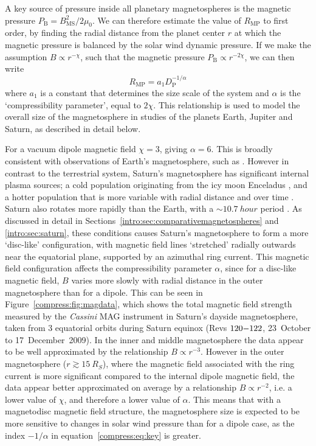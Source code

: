 A key source of pressure inside all planetary magnetospheres is the magnetic pressure $P_\mathrm{B}=B_\mathrm{MS}^2/2\mu_0$. We can therefore estimate the value of $R_\mathrm{MP}$ to first order, by finding the radial distance from the planet center $r$ at which the magnetic pressure is  balanced by the solar wind dynamic pressure. If we make the assumption $B \propto r^{-\chi}$, such that the magnetic pressure $P_\mathrm{B} \propto r^{-2\chi}$, we can then write
\begin{equation}\label{compress:eq:key}
R_\mathrm{MP}=a_1D_\mathrm{P}^{-1/\alpha}
\end{equation}
where $a_1$ is a constant that determines the size scale of the system and $\alpha$ is the `compressibility parameter', equal to $2\chi$. This relationship is used to model the overall size of the magnetosphere in studies of the planets Earth, Jupiter and Saturn, as described in detail below. 

For a vacuum dipole magnetic field $\chi=3$, giving $\alpha=6$. This is broadly consistent with observations of Earth's magnetosphere, such as \citet{shue1997}. However in contrast to the terrestrial system, Saturn's magnetosphere has significant internal plasma sources; a cold population originating from the icy moon Enceladus \citep[e.g.][]{dougherty2006,tokar2006}, and a hotter population that is more variable with radial distance and over time \citep[e.g.][]{sergis2009}. Saturn also rotates more rapidly  than the Earth, with a ${\sim}\SI{10.7}{hour}$ period \citep{desch1981}. As discussed in detail in Sections~\ref{intro:sec:comparativemagnetospheres} and \ref{intro:sec:saturn}, these conditions causes Saturn's magnetosphere to form a more `disc-like' configuration, with magnetic field lines `stretched' radially outwards near the equatorial plane, supported by an azimuthal ring current. This magnetic field configuration affects the compressibility parameter $\alpha$, since for a disc-like magnetic field, $B$ varies more slowly with radial distance in the outer magnetosphere than for a dipole. This can be seen in Figure~\ref{compress:fig:magdata}, which shows the total magnetic field strength measured by the \textit{Cassini} MAG instrument in Saturn's dayside magnetosphere, taken from 3 equatorial orbits during Saturn equinox (Revs $120{\--}122$, 23~October to 17~December~2009). In the inner and middle magnetosphere the data appear to be well approximated by the relationship $B \propto r^{-3}$. However in the outer magnetosphere ($r \gtrsim \SI{15}{R_S}$), where the magnetic field associated with the ring current is more significant compared to the internal dipole magnetic field, the data appear better approximated on average by a relationship $B \propto r^{-2}$, i.e. a lower value of $\chi$, and therefore a lower value of $\alpha$. This means that with a magnetodisc magnetic field structure, the magnetosphere size is expected to be more sensitive to changes in solar wind pressure than for a dipole case, as the index $-1/\alpha$ in equation~\ref{compress:eq:key} is greater.

